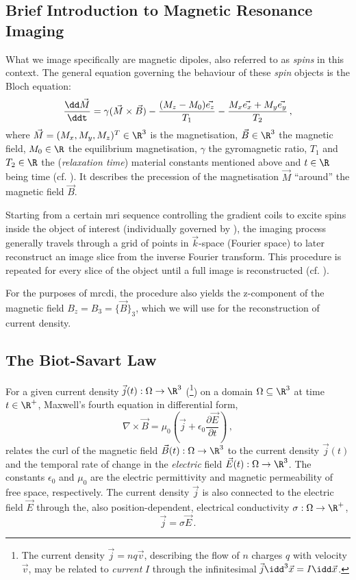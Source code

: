 \documentclass[10pt]{article}
\begin{document}
  \subsection{Brief Introduction to Magnetic Resonance Imaging}
  What we image specifically are magnetic dipoles, also referred to as \textit{spins} in this context.
  The general equation governing the behaviour of these \textit{spin} objects is the Bloch equation:
  \begin{equation}
    \frac{\dd \vec{M}}{\ddt} = \gamma (\vec{M} \times \vec{B}) - \frac{(M_z - M_0) \vec{e_z}}{T_1} - \frac{M_x \vec{e_x} + M_y \vec{e_y}}{T_2}\,,
    \label{eq:bloch}
  \end{equation}
  where $\vec{M} = (M_x, M_y, M_z)^T \in \R^3$ is the magnetisation, $\vec{B} \in \R^3$ the magnetic field, $M_0 \in \R$ the equilibrium magnetisation, $\gamma$ the gyromagnetic ratio, $T_1$ and $T_2 \in \R$ the (\textit{relaxation time}) material constants mentioned above and $t \in \R$ being time (cf. \cite{1996-mri-basics}).
  It describes the precession of the magnetisation $\vec{M}$ ``around'' the magnetic field $\vec{B}$.

  Starting from a certain \gls{mri} sequence controlling the gradient coils to excite spins inside the object of interest (individually governed by ), the imaging process generally travels through a grid of points in $\vec{k}$-space (Fourier space) to later reconstruct an image slice from the inverse Fourier transform.
  This procedure is repeated for every slice of the object until a full image is reconstructed (cf. \cite{1996-mri-basics}).

  For the purposes of \gls{mrcdi}, the procedure also yields the z-component of the magnetic field $B_z = B_3 = \{\vec{B}\}_3$, which we will use for the reconstruction of current density.

  \subsection{The Biot-Savart Law}
  For a given current density $\vec{j}(t): \Omega \to \R^3$ (\footnote{
    The current density $\vec{j} = nq\vec{v}$, describing the flow of $n$ charges $q$ with velocity $\vec{v}$, may be related to \textit{current} $I$ through the infinitesimal $\vec{j} \idd^3\vec{x} = I \idd\vec{x}$.
  }) on a domain $\Omega \subseteq \R^3$ at time $t \in \R^+$, Maxwell's fourth equation in differential form,
  \begin{equation*}
    \nabla \times \vec{B} = \mu_0 \left(\vec{j} + \epsilon_0 \frac{\partial \vec{E}}{\partial t}\right)\,,
    \label{eq:maxwell-4}
  \end{equation*}
  relates the curl of the magnetic field $\vec{B}(t): \Omega \to \R^3$ to the current density $\vec{j}(t)$ and the temporal rate of change in the \textit{electric} field $\vec{E}(t): \Omega \to \R^3$.
  The constants $\epsilon_0$ and $\mu_0$ are the electric permittivity and magnetic permeability of free space, respectively.
  The current density $\vec{j}$ is also connected to the electric field $\vec{E}$ through the, also position-dependent, electrical conductivity $\sigma: \Omega \to \R^+$,
  $$\vec{j} = \sigma \vec{E}\,.$$
\end{document}
